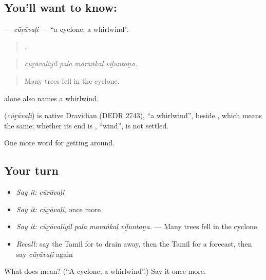 \subsection*{You'll want to know: }
\textbf{} — \emph{cūṟāvaḷi} — \textquotedblleft{}a cyclone; a whirlwind\textquotedblright{}.

\begin{quote}
   .
\end{quote}

\begin{quote}
\emph{cūṟāvaḷiyil pala maraṅkaḷ viḻuntaṉa.}
\end{quote}

\begin{quote}
Many trees fell in the cyclone.
\end{quote}

 alone also names a whirlwind.

\begin{cousinweb}
\textbf{} (\emph{cūṟāvaḷi}) is native Dravidian (DEDR 2743), \textquotedblleft{}a whirlwind\textquotedblright{}, beside , which means the same; whether its end is , \textquotedblleft{}wind\textquotedblright{}, is not settled.
\end{cousinweb}

\begin{grammarlens}[title={What you've built}]
One more word for getting around.
\end{grammarlens}

\subsection*{Your turn}
\begin{itemize}
\raggedright
  \item \emph{Say it:} \emph{cūṟāvaḷi}
  \item \emph{Say it:} \emph{cūṟāvaḷi}, once more
  \item \emph{Say it:} \emph{cūṟāvaḷiyil pala maraṅkaḷ viḻuntaṉa.} — Many trees fell in the cyclone.
  \item \emph{Recall:} say the Tamil for to drain away, then the Tamil for a forecast, then say \emph{cūṟāvaḷi} again
\end{itemize}

\begin{tcolorbox}[breakable,colback=teal!4,colframe=teal!35!black,title={Before you move on}]
What does  mean? (\textquotedblleft{}A cyclone; a whirlwind\textquotedblright{}.) Say it once more.
\end{tcolorbox}
